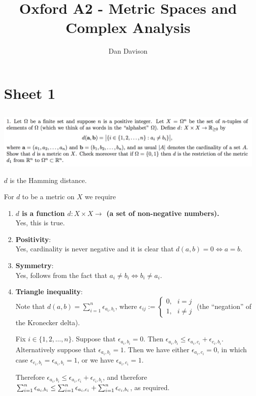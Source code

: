 \documentclass[12pt]{article}
\begin{document}
\title{Oxford A2 - Metric Spaces and Complex Analysis
  } \author{Dan Davison}
\author{}
\date{}
\maketitle

\section{Sheet 1}

\subsection{}
\begin{mdframed}
\includegraphics[width=400pt]{img/oxford-a2-1-1.png}
\end{mdframed}

\begin{remark*}
  $d$ is the Hamming distance.
\end{remark*}

For $d$ to be a metric on $X$ we require
\begin{enumerate}
\item \textbf{$d$ is a function $d:X \times X \to $ (a set of non-negative numbers).}\\
  Yes, this is true.
\item \textbf{Positivity}:\\
  Yes, cardinality is never negative and it is clear that $d(a,b) = 0 \iff a = b$.
\item \textbf{Symmetry}:\\
  Yes, follows from the fact that $a_i \neq b_i \iff b_i \neq a_i$.
\item \textbf{Triangle inequality}:\\
  Note that $d(a, b) = \sum_{i=1}^n \epsilon_{a_i,b_i}$, where $\epsilon_{ij} :=
  \begin{cases}
    0, ~~~ i = j\\
    1, ~~~ i \neq j
  \end{cases}
$ (the ``negation'' of the Kronecker delta).

  Fix $i \in \{1, 2, \ldots, n\}$. Suppose that $\epsilon_{a_i,b_i} = 0$. Then
  $\epsilon_{a_i,b_i} \leq \epsilon_{a_i,c_i} + \epsilon_{c_i,b_i}$. Alternatively suppose that
  $\epsilon_{a_i,b_i} = 1$. Then we have either $\epsilon_{a_i,c_i} = 0$, in which case
  $\epsilon_{c_i,b_i} = \epsilon_{a_i,b_i} = 1$, or we have $\epsilon_{a_i,c_i} = 1$.

  Therefore $\epsilon_{a_i,b_i} \leq \epsilon_{a_i,c_i} + \epsilon_{c_i,b_i}$, and therefore
  $\sum_{i=1}^{n} \epsilon_{a_i,b_i} \leq \sum_{i=1}^{n} \epsilon_{a_i,c_i} + \sum_{i=1}^{n} \epsilon_{c_i,b_i}$, as required.
\end{enumerate}
\end{document}

